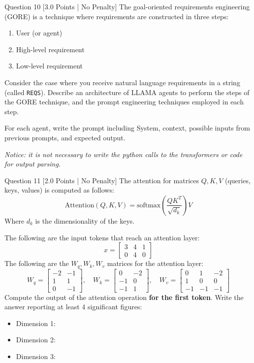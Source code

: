 \documentclass[11pt,a4paper]{article}
\begin{document}
\begin{questionbox}{Question 10 \hfill [3.0 Points | No Penalty]}
The goal-oriented requirements engineering (GORE) is a technique where requirements are constructed in three steps:
\begin{enumerate}
    \item User (or agent)
    \item High-level requirement
    \item Low-level requirement
\end{enumerate}
Consider the case where you receive natural language requirements in a string (called \texttt{REQS}). Describe an architecture of LLAMA agents to perform the steps of the GORE technique, and the prompt engineering techniques employed in each step.

For each agent, write the prompt including System, context, possible inputs from previous prompts, and expected output.

\textit{Notice: it is not necessary to write the python calls to the transformers or code for output parsing.}
\end{questionbox}

\begin{questionbox}{Question 11 \hfill [2.0 Points | No Penalty]}
The attention for matrices $Q, K, V$ (queries, keys, values) is computed as follows:
\[
\text{Attention}(Q, K, V) = \text{softmax}\left(\frac{Q K^T}{\sqrt{d_k}}\right) V
\]
Where $d_k$ is the dimensionality of the keys.

The following are the input tokens that reach an attention layer:
\[
x = \begin{bmatrix}
3 & 4 & 1 \\
0 & 4 & 0
\end{bmatrix}
\]
The following are the $W_q, W_k, W_v$ matrices for the attention layer:
\[
W_q = \begin{bmatrix}
-2 & -1 \\
1 & 1 \\
0 & -1
\end{bmatrix}, \quad
W_k = \begin{bmatrix}
0 & -2 \\
-1 & 0 \\
-1 & 1
\end{bmatrix}, \quad
W_v = \begin{bmatrix}
0 & 1 & -2 \\
1 & 0 & 0 \\
-1 & -1 & -1
\end{bmatrix}
\]
Compute the output of the attention operation \textbf{for the first token}.
Write the answer reporting at least 4 significant figures:
\begin{itemize}
    \item Dimension 1: \underline{\hspace{4cm}}
    \item Dimension 2: \underline{\hspace{4cm}}
    \item Dimension 3: \underline{\hspace{4cm}}
\end{itemize}
\end{questionbox}
\end{document}
